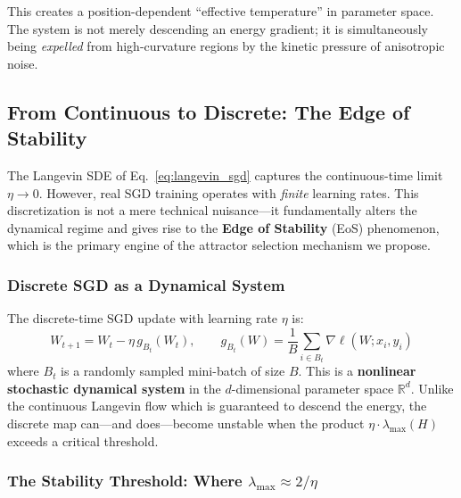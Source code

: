 \documentclass[
  journal=largetwo,
  year=2025,
  volume=37,
]{cup-journal}
\begin{document}
This creates a position-dependent ``effective temperature'' in parameter space. The system is not merely descending an energy gradient; it is simultaneously being \textit{expelled} from high-curvature regions by the kinetic pressure of anisotropic noise.

\subsection{From Continuous to Discrete: The Edge of Stability}

The Langevin SDE of Eq.~\eqref{eq:langevin_sgd} captures the continuous-time limit $\eta \to 0$. However, real SGD training operates with \textit{finite} learning rates. This discretization is not a mere technical nuisance---it fundamentally alters the dynamical regime and gives rise to the \textbf{Edge of Stability} (EoS) phenomenon, which is the primary engine of the attractor selection mechanism we propose.

\subsubsection{Discrete SGD as a Dynamical System}

The discrete-time SGD update with learning rate $\eta$ is:
\begin{equation}\label{eq:sgd_discrete_eos}
    W_{t+1} = W_t - \eta \, g_{B_t}(W_t), \qquad g_{B_t}(W) = \frac{1}{B}\sum_{i \in B_t} \nabla \ell(W; x_i, y_i)
\end{equation}
where $B_t$ is a randomly sampled mini-batch of size $B$. This is a \textbf{nonlinear stochastic dynamical system} in the $d$-dimensional parameter space $\mathbb{R}^d$. Unlike the continuous Langevin flow which is guaranteed to descend the energy, the discrete map can---and does---become unstable when the product $\eta \cdot \lambda_{\max}(H)$ exceeds a critical threshold.

\subsubsection{The Stability Threshold: Where $\lambda_{\max} \approx 2/\eta$}
\end{document}
